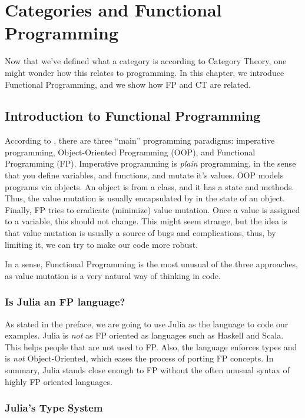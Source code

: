 \chapter{Categories and Functional Programming}

Now that we've defined what a category is according to Category Theory,
one might wonder how this relates to programming. In this chapter,
we introduce Functional Programming,
and we show how FP and CT are related.

\section{Introduction to Functional Programming}

According to \citet{widman2022learning},
there are three ``main'' programming paradigms: imperative programming, Object-Oriented Programming (OOP), and Functional Programming (FP).
Imperative programming is \textit{plain} programming, in the sense that you define variables, and functions, and mutate it's values.
OOP models programs via objects. An object is from a class, and it has a state and methods. Thus, the value mutation is usually
encapsulated by in the state of an object.
Finally, FP tries to eradicate (minimize) value mutation. Once a value is assigned to a variable, this should not change.
This might seem strange, but the idea is that value mutation is usually a source of bugs and complications, thus,
by limiting it, we can try to make our code more robust.

In a sense, Functional Programming is the most unusual of the three approaches, as value mutation
is a very natural way of thinking in code.

\subsection{Is Julia an FP language?}

As stated in the preface, we are going to use
Julia as the language to code our examples.
Julia is \textit{not} as FP oriented as languages such as Haskell and Scala.
This helps people that are not used to FP. Also,
the language enforces types and is \textit{not} Object-Oriented, which eases
the process of porting FP concepts. In summary, Julia stands close enough to FP
without the often unusual syntax of highly FP oriented languages.

\subsection{Julia's Type System}

